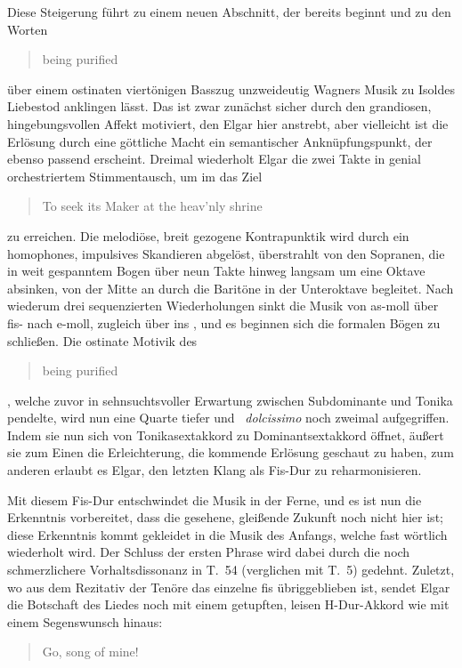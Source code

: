 \documentclass[a4paper,11pt,open=any]{scrbook}
\newcommand{\engquote}[1]{\foreignblockquote{english}{#1}}
\begin{document}
Diese Steigerung führt zu einem neuen Abschnitt, der 
bereits beginnt und zu den Worten \engquote{being purified} über einem
ostinaten viertönigen Basszug unzweideutig Wagners Musik zu Isoldes
Liebestod anklingen lässt.\cite[p.~553]{moore}  Das ist zwar zunächst
sicher durch den grandiosen, hingebungsvollen Affekt motiviert, den Elgar
hier anstrebt, aber vielleicht ist die Erlösung durch eine göttliche Macht
ein semantischer Anknüpfungspunkt, der ebenso passend erscheint.  Dreimal
wiederholt Elgar die zwei Takte in genial orchestriertem Stimmentausch, um
im  das Ziel \engquote{To seek its Maker at the heav’nly
shrine} zu erreichen.  Die melodiöse, breit gezogene Kontrapunktik wird
durch ein homophones, impulsives Skandieren abgelöst, überstrahlt von den
Sopranen, die in weit gespanntem Bogen über neun Takte hinweg langsam um
eine Oktave absinken, von der Mitte an durch die Baritöne in der Unteroktave
begleitet.  Nach wiederum drei sequenzierten Wiederholungen sinkt die Musik
von as-moll über fis- nach e-moll, zugleich über  ins
, und es beginnen sich die formalen Bögen zu schließen.
Die ostinate Motivik des \engquote{being purified}, welche zuvor in
sehnsuchtsvoller Erwartung zwischen Subdominante und Tonika pendelte,
wird nun eine Quarte tiefer und ~\textit{dolcissimo}
noch zweimal aufgegriffen.  Indem sie nun sich von Tonikasextakkord zu
Dominantsextakkord öffnet, äußert sie zum Einen die Erleichterung, die
kommende Erlösung geschaut zu haben, zum anderen erlaubt es Elgar, den
letzten Klang als Fis-Dur zu reharmonisieren.

Mit diesem Fis-Dur entschwindet die Musik in der Ferne, und es ist nun die
Erkenntnis vorbereitet, dass die gesehene, gleißende Zukunft noch nicht hier
ist; diese Erkenntnis kommt gekleidet in die Musik des Anfangs, welche fast
wörtlich wiederholt wird.  Der Schluss der ersten Phrase wird dabei durch
die noch schmerzlichere Vorhaltsdissonanz in T.~54 (verglichen mit T.~5)
gedehnt.  Zuletzt, wo aus dem Rezitativ der Tenöre das einzelne \textsf{fis}
übriggeblieben ist, sendet Elgar die Botschaft des Liedes noch mit einem
getupften, leisen H-Dur-Akkord wie mit einem Segenswunsch hinaus:
\engquote{Go, song of mine!}
\end{document}
